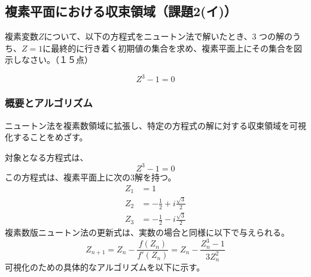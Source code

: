 \documentclass[dvipdfmx,a4paper]{jsarticle}
\begin{document}
\subsection{複素平面における収束領域（課題2(イ)）}

複素変数$Z$について、以下の方程式をニュートン法で解いたとき、3 つの解のうち、$Z=1$に最終的に行き着く初期値の集合を求め、複素平面上にその集合を図示しなさい。（１５点）

$$Z^3-1=0$$

\subsubsection{概要とアルゴリズム}
ニュートン法を複素数領域に拡張し、特定の方程式の解に対する収束領域を可視化することをめざす。

対象となる方程式は、
$$
Z^3 - 1 = 0
$$
この方程式は、複素平面上に次の3解を持つ。
\begin{align*}
    Z_1 &= 1 \\
    Z_2 &= -\frac{1}{2} + i \frac{\sqrt{3}}{2} \\
    Z_3 &= -\frac{1}{2} - i \frac{\sqrt{3}}{2}
\end{align*}
複素数版ニュートン法の更新式は、実数の場合と同様に以下で与えられる。
$$
Z_{n+1} = Z_n - \frac{f(Z_n)}{f'(Z_n)} = Z_n - \frac{Z_n^3 - 1}{3Z_n^2}
$$
可視化のための具体的なアルゴリズムを以下に示す。
\end{document}
